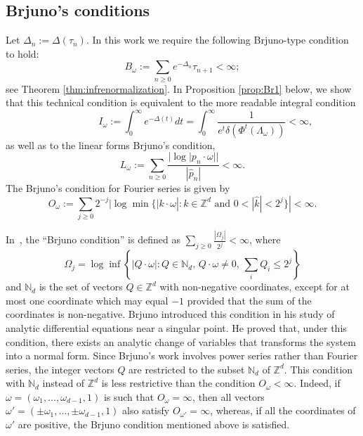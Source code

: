 \documentclass[12pt,reqno,a4paper]{amsart}%
\numberwithin{equation}{section}
\newcommand{\Zz}{{\mathbb{Z}}}
\newcommand{\tcb}{\textcolor{blue}}
\begin{document}
	
	
\subsection{Brjuno's conditions}
\label{sec:Brjuno conditions}
Let $\Delta_n:=\Delta(\tau_n)$. In this work we require the following Brjuno-type condition to hold:
\[
 B_{\omega}:=\sum_{n\geq 0}e^{-\Delta_n}\tau_{n+1}<\infty;
\]
see Theorem  \ref{thm:infrenormalization}. 
In Proposition \ref{prop:Br1} below, we show that this technical condition is equivalent to the more readable integral condition
\[
\hspace{2cm}I_{\omega}:=\int_{0}^{\infty}e^{-\Delta(t)}dt=\int_{0}^{\infty}\frac1{e^t\delta(\Phi^t(\Lambda_{\omega}))}<\infty,
\] 
as well as to the linear forms Brjuno's condition, 
\[
 L_{\omega}:=\sum_{n\geq 0}\frac{|\log |p_n\cdot\omega||}{|\hat p_n|}<\infty.
\]
The  Brjuno's condition for Fourier series is given by 
\[
 O_{\omega}:=\sum_{j\geq 0}2^{-j}|\log\min\{|k\cdot\omega|:k\in\Zz^d\text{ and }0<|\hat k|<2^j\}|<\infty.
\] 	



\begin{remark}   
    In~\cite{Brjuno,Brjuno2}, the ``Brjuno condition'' is defined as $\sum_{j \ge 0} \frac{|\Omega_j|}{2^j} < \infty$, where
    \[
    \Omega_j = \log \inf \left\{ |Q \cdot \omega| \colon Q \in \mathbb{N}_d, \, Q \cdot \omega \neq 0, \, \sum_{i} Q_i \le 2^j \right\}
    \]
    and $\mathbb{N}_d$ is the set of vectors $Q \in \mathbb{Z}^d$ with non-negative coordinates, except for at most one coordinate which may equal $-1$ provided that the sum of the coordinates is non-negative. Brjuno introduced this condition in his study of analytic differential equations near a singular point. He proved that, under this condition, there exists an analytic change of variables that transforms the system into a normal form. Since  Brjuno's work involves power series rather than Fourier series,  the integer vectors $Q$ are restricted to the subset $\mathbb{N}_d$ of $\mathbb{Z}^d$.   
    This  condition with $\mathbb N_d$ instead of $\mathbb Z^d$ is less restrictive than the condition $O_{\omega} < \infty$. Indeed, if $\omega = (\omega_1, \dots, \omega_{d-1}, 1)$  is such that $O_{\omega} = \infty$, then all vectors $\omega' = (\pm \omega_1, \dots, \pm \omega_{d-1}, 1)$ also satisfy $O_{\omega'} = \infty$, whereas, if all the coordinates of $\omega'$ are positive,  the Brjuno condition mentioned above is satisfied.
\end{remark}  
\end{document}
